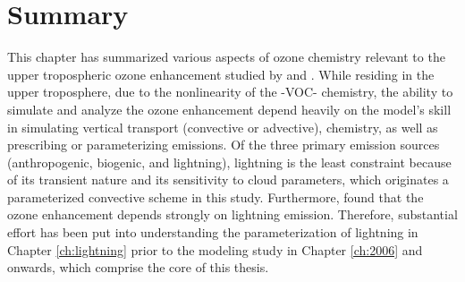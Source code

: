 \section{Summary} \label{sect:intro/summary}

This chapter has summarized various aspects of ozone chemistry relevant to the upper tropospheric ozone
enhancement studied by \citet{Li:2005ss} and \citet{Cooper:2007cr}. While residing in the upper
troposphere, due to the nonlinearity of the -VOC- chemistry, the ability to
simulate and analyze the ozone enhancement depend heavily on the model's skill in simulating
vertical transport (convective or advective), chemistry, as well as prescribing or parameterizing emissions.
Of the three primary emission sources (anthropogenic, biogenic, and lightning), lightning 
is the least constraint because of its transient nature and its sensitivity to cloud parameters, which originates
a parameterized convective scheme in this study. Furthermore, \citet{Cooper:2009nx} found that the ozone
enhancement depends strongly on lightning emission. Therefore, substantial effort has been put into
understanding the parameterization of lightning in Chapter \ref{ch:lightning} prior to the modeling study in
Chapter \ref{ch:2006} and onwards, which comprise the core of this thesis.


